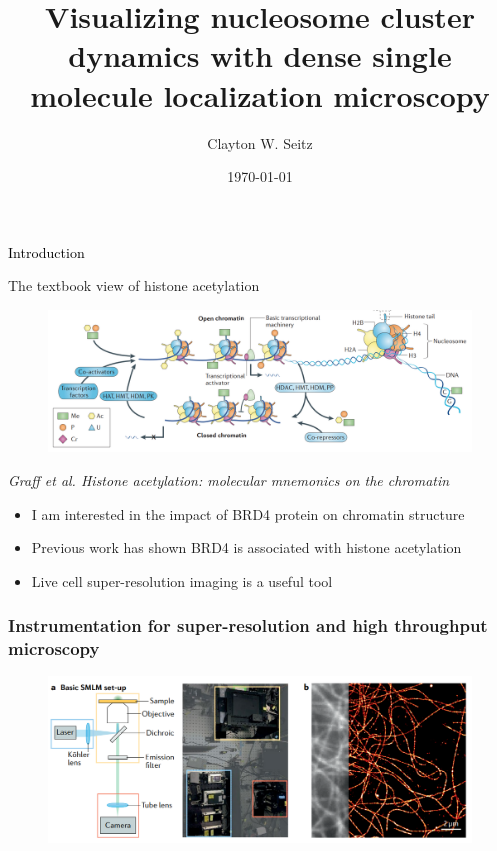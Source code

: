 \documentclass{beamer}					%
\title{Visualizing nucleosome cluster dynamics with dense single molecule localization microscopy}	%
\author{Clayton W. Seitz}								%
\date{\today}									%
\begin{document}
\begin{frame}
  \titlepage
\end{frame}


%


\begin{frame}
\frametitle{}
\centering
\Large \textcolor{black}{Introduction}
\end{frame}


\begin{frame}{The textbook view of histone acetylation}
\begin{figure}
\includegraphics[width=13cm]{Histones.png}
\end{figure}
\textit{Graff et al. Histone acetylation: molecular
mnemonics on the chromatin}
\vspace{0.1in}
\begin{itemize}
\item I am interested in the impact of BRD4 protein on chromatin structure
\item Previous work has shown BRD4 is associated with histone acetylation
\item Live cell super-resolution imaging is a useful tool
\end{itemize}
\end{frame}

\begin{frame}
\frametitle{Instrumentation for super-resolution and high throughput microscopy}

\begin{figure}
\includegraphics[width=12cm]{Setup.png}
\end{figure}
  
\end{frame}
\end{document}
